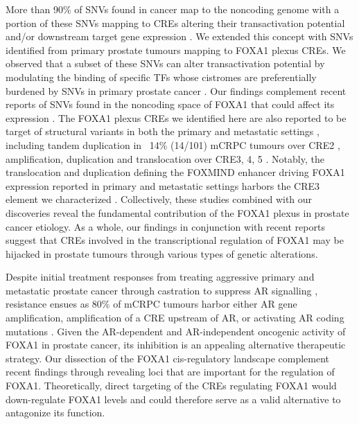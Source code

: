 More than 90\% of SNVs found in cancer map to the noncoding genome \cite{meltonRecurrentSomaticMutations2015,mazrooeiCistromePartitioningReveals2019} with a portion of these SNVs mapping to CREs altering their transactivation potential \cite{baileyNoncodingSomaticInherited2016,zhangIntegrativeFunctionalGenomics2012,huangHighlyRecurrentTERT2013,hornTERTPromoterMutations2013} and/or downstream target gene expression \cite{zhouEmergenceNoncodingCancer2016,meltonRecurrentSomaticMutations2015,weinholdGenomewideAnalysisNoncoding2014}.
We extended this concept with SNVs identified from primary prostate tumours mapping to FOXA1 plexus CREs.
We observed that a subset of these SNVs can alter transactivation potential by modulating the binding of specific TFs whose cistromes are preferentially burdened by SNVs in primary prostate cancer \cite{mazrooeiCistromePartitioningReveals2019}.
Our findings complement recent reports of SNVs found in the noncoding space of FOXA1 that could affect its expression \cite{annalaFrequentMutationFOXA12018,camcapstudygroupSequencingProstateCancers2018}.
The FOXA1 plexus CREs we identified here are also reported to be target of structural variants in both the primary and metastatic settings \cite{paroliaDistinctStructuralClasses2019,quigleyGenomicHallmarksStructural2018}, including tandem duplication in ~14\% (14/101) mCRPC tumours over CRE2 \cite{quigleyGenomicHallmarksStructural2018}, amplification, duplication and translocation over CRE3, 4, 5 \cite{paroliaDistinctStructuralClasses2019}.
Notably, the translocation and duplication defining the FOXMIND enhancer driving FOXA1 expression reported in primary and metastatic settings harbors the CRE3 element we characterized \cite{paroliaDistinctStructuralClasses2019}.
Collectively, these studies combined with our discoveries reveal the fundamental contribution of the FOXA1 plexus in prostate cancer etiology.
As a whole, our findings in conjunction with recent reports suggest that CREs involved in the transcriptional regulation of FOXA1 may be hijacked in prostate tumours through various types of genetic alterations.

Despite initial treatment responses from treating aggressive primary and metastatic prostate cancer through castration to suppress AR signalling \cite{attardProstateCancer2016}, resistance ensues as 80\% of mCRPC tumours harbor either AR gene amplification, amplification of a CRE upstream of AR, or activating AR coding mutations \cite{robinsonIntegrativeClinicalGenomics2015,takedaSomaticallyAcquiredEnhancer2018,quigleyGenomicHallmarksStructural2018}.
Given the AR-dependent \cite{yangCurrentPerspectivesFOXA12015,pomerantzAndrogenReceptorCistrome2015} and AR-independent \cite{sunkelIntegrativeAnalysisIdentifies2017} oncogenic activity of FOXA1 in prostate cancer, its inhibition is an appealing alternative therapeutic strategy.
Our dissection of the FOXA1 cis-regulatory landscape complement recent findings through revealing loci that are important for the regulation of FOXA1.
Theoretically, direct targeting of the CREs regulating FOXA1 would down-regulate FOXA1 levels and could therefore serve as a valid alternative to antagonize its function.

